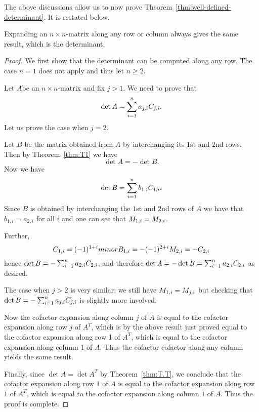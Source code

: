 The above discussions allow us to now prove
Theorem~\ref{thm:well-defined-determinant}. It is restated below.

\begin{theorem}{}{}
  Expanding an $n\times n$-matrix along any row or column always gives
  the same result, which is the determinant.
\end{theorem}

\begin{proof}
  We first show that the determinant can be computed along any
  row. The case $n=1$ does not apply and thus let $n \geq 2$.


  Let $A$be an $n\times n$-matrix and fix $j>1$. We need to prove that
  \begin{equation*}
    \det A=\sum_{i=1}^n a_{j,i} \cof{A}{j,i}.
  \end{equation*}
  Let us prove the case when $j=2$.

  Let $B$ be the matrix obtained from $A$ by interchanging its $1$st
  and $2$nd rows.  Then by Theorem~\ref{thm:T1} we have
  \begin{equation*}
    \det A=-\det B.
  \end{equation*}
  Now we have
  \begin{equation*}
    \det B=\sum_{i=1}^n b_{1,i} \cof{B}{1,i}.
  \end{equation*}
  Since $B$ is obtained by interchanging the $1$st and $2$nd rows of
  $A$ we have that $b_{1,i}=a_{2,i}$ for all $i$ and one can see that
  $\minor{B}{1,i}=\minor{A}{2,i}$.

  Further,
  \begin{equation*}
    \cof{B}{1,i}=(-1)^{1+i} minor B_{1,i}=- (-1)^{2+i} \minor{A}{2,i} = - \cof{A}{2,i}
  \end{equation*}
  hence $\det B=-\sum_{i=1}^n a_{2,i} \cof{A}{2,i}$, and therefore
  $\det A=-\det B= \sum_{i=1}^n a_{2,i} \cof{A}{2,i}$ as desired.

  The case when $j>2$ is very similar; we still have
  $\minor{B}{1,i}=\minor{A}{j,i}$ but checking that
  $\det B=-\sum_{i=1}^n a_{j,i} \cof{A}{j,i}$ is slightly more
  involved.

  Now the cofactor expansion along column $j$ of $A$ is equal to the
  cofactor expansion along row $j$ of $A^T$, which is by the above
  result just proved equal to the cofactor expansion along row 1 of
  $A^T$, which is equal to the cofactor expansion along column $1$ of
  $A$. Thus the cofactor cofactor along any column yields the same
  result.

  Finally, since $\det A=\det A^T$ by Theorem~\ref{thm:T.T}, we
  conclude that the cofactor expansion along row $1$ of $A$ is equal
  to the cofactor expansion along row $1$ of $A^T$, which is equal to
  the cofactor expansion along column $1$ of $A$. Thus the proof is
  complete.
\end{proof}
